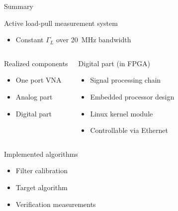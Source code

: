 \documentclass{beamer}
\begin{document}
\begin{frame}[t]{Summary}
    \begin{exampleblock}{Active load-pull measurement system}
        \begin{itemize}
            \item Constant $\Gamma_L$ over \SI{20}{\mega\hertz} bandwidth
        \end{itemize}
    \end{exampleblock}
    \begin{columns}
            \begin{block}{Realized components}
                \begin{itemize}
                    \item One port VNA
                    \item Analog part
                    \item Digital part
                \end{itemize}
            \end{block}
            \begin{block}{Digital part (in FPGA)}
                \begin{itemize}
                    \item Signal processing chain
                    \item Embedded processor design
                    \item Linux kernel module
                    \item Controllable via Ethernet
                \end{itemize}
            \end{block}
    \end{columns}

    \begin{columns}
            \begin{block}{Implemented algorithms}
                \begin{itemize}
                    \item Filter calibration
                    \item Target algorithm
                    \item Verification measurements
                \end{itemize}
            \end{block}
    \end{columns}


\end{frame}
\end{document}

